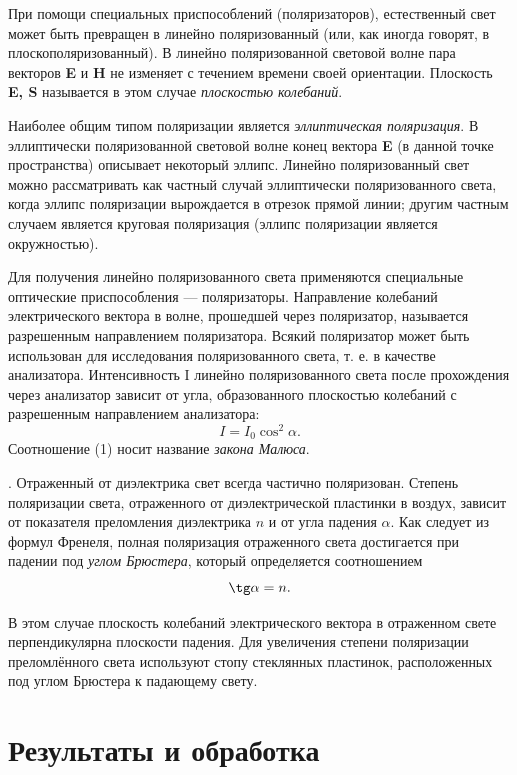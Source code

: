 При помощи специальных приспособлений (поляризаторов), естественный свет может быть превращен в линейно поляризованный (или, как иногда говорят, в плоскополяризованный). В линейно поляризованной световой волне пара векторов \textbf{E} и \textbf{H} не изменяет с течением времени своей ориентации. Плоскость \textbf{E, S} называется в этом случае \textit{плоскостью колебаний}. \par
Наиболее общим типом поляризации является \textit{эллиптическая поляризация}. В эллиптически поляризованной световой волне конец вектора
\textbf{E} (в данной точке пространства) описывает некоторый эллипс. Линейно
поляризованный свет можно рассматривать как частный случай эллиптически поляризованного света, когда эллипс поляризации вырождается в отрезок прямой линии; другим частным случаем является круговая
поляризация (эллипс поляризации является окружностью). \par
Для получения линейно поляризованного света применяются специальные оптические приспособления — поляризаторы. Направление колебаний электрического вектора в волне, прошедшей через поляризатор, называется
разрешенным направлением поляризатора.
Всякий поляризатор может быть использован для исследования поляризованного света, т. е. в качестве анализатора. Интенсивность I линейно поляризованного света после прохождения через анализатор зависит от угла, образованного плоскостью колебаний с разрешенным направлением анализатора:
\begin{equation}
  I = I_0 \cos^2\alpha.
\end{equation}
Соотношение (1) носит название \textit{закона Малюса}. \par
. Отраженный от диэлектрика свет всегда частично поляризован. Степень поляризации света, отраженного от диэлектрической пластинки в воздух, зависит от показателя преломления диэлектрика $n$ и от угла падения $\alpha$. Как следует из формул Френеля, полная поляризация отраженного света достигается
при падении под \textit{углом Брюстера}, который определяется соотношением
\begin{equation}
 \tg \alpha = n.
\end{equation}

В этом случае плоскость колебаний электрического вектора в отраженном свете перпендикулярна плоскости падения. Для увеличения степени поляризации преломлённого
света используют стопу стеклянных пластинок, расположенных под углом Брюстера к падающему свету.

\section*{Результаты и обработка}
